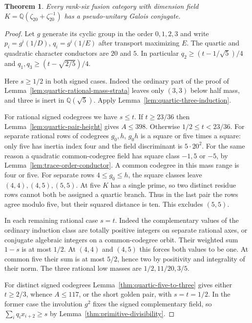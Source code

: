 \documentclass[11pt,reqno]{amsart}
\newtheorem{theorem}{Theorem}[section]
\theoremstyle{remark}\newtheorem{remark}[theorem]{Remark}
\numberwithin{equation}{section}
\begin{document}
\begin{theorem}\label{thm:quartic-cyclic-twenty-all}
Every rank-six fusion category with dimension field
$K=\mathbb Q(\zeta_{20}+\zeta_{20}^{-1})$ has a pseudo-unitary
Galois conjugate.
\end{theorem}
\begin{proof}
Let $g$ generate its cyclic group in the order $0,1,2,3$ and
write $p_i=g^i(1/D)$, $q_i=g^i(1/E)$ after transport maximizing
$E$. The quartic and quadratic character conductors are $20$ and
$5$. In particular $q_2\ge(t-1/\sqrt5)/4$ and
$q_1,q_3\ge(t-\sqrt{2/5})/4$.

Here $s\ge1/2$ in both signed cases. Indeed the ordinary part of the
proof of Lemma~\ref{lem:quartic-rational-mass-strata} leaves only
$(3,3)$ below half mass, and three is inert in $\mathbb Q(\sqrt5)$.
Apply Lemma~\ref{lem:quartic-three-induction}.

For rational signed codegrees we have $s\le t$. If $t\ge23/36$ then
Lemma~\ref{lem:quartic-pair-height} gives $A\le398$. Otherwise
$1/2\le t<23/36$. For separate rational rows of codegrees $g_0,h$,
$g_0h$ is a square or five times a square: only five has inertia index
four and the field discriminant is $5\cdot20^2$. For the same reason
a quadratic common-codegree field has square class $-1,5$ or $-5$,
by Lemma~\ref{lem:trace-order-conductor}. A common codegree in this
mass range is four or five. For separate rows $4\le g_0\le h$,
the square classes leave $(4,4),(4,5),(5,5)$. At five $K$ has
a single prime, so two distinct residue rows cannot both be assigned
a quartic branch. Thus in the last pair the rows agree modulo five,
but their squared distance is ten. This excludes $(5,5)$.

In each remaining rational case $s=t$. Indeed the complementary
values of the ordinary induction class are totally positive integers
on separate rational axes, or conjugate algebraic integers on a
common-codegree orbit. Their weighted sum $1-s$ is at most $1/2$.
At $(4,4)$ and $(4,5)$ this forces both values to be one. At common
five their sum is at most $5/2$, hence two by positivity and
integrality of their norm. The three rational low masses are
$1/2,11/20,3/5$.

For distinct signed codegrees Lemma~\ref{thm:quartic-five-to-three}
gives either $t\ge2/3$, whence $A\le117$, or the short golden
pair, with $s=t=1/2$. In the former case the involution $g^2$ fixes
the signed complementary field, so
$\sum_i q_i x_{i+2}\ge s$ by Lemma~\ref{thm:primitive-divisibility}.


\end{proof}
\end{document}
